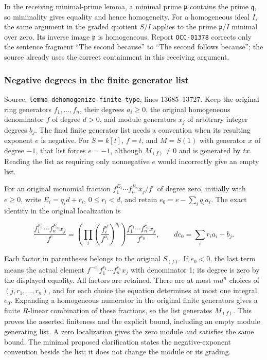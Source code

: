 In the receiving minimal-prime lemma, a minimal prime \(\mathfrak p\) contains the prime \(\mathfrak q\), so minimality gives equality and hence homogeneity. For a homogeneous ideal \(I\), the same argument in the graded quotient \(S/I\) applies to the prime \(\mathfrak p/I\) minimal over zero. Its inverse image \(\mathfrak p\) is homogeneous. Report \texttt{OCC-01378} corrects only the sentence fragment ``The second because'' to ``The second follows because''; the source already uses the correct containment in this receiving argument.

\subsubsection{Negative degrees in the finite generator list}\label{algebra-proof-002-negative-degrees-in-the-finite-generator-list}

Source: \texttt{lemma-\AlgebraIdentifierBreak{}dehomogenize\AlgebraIdentifierBreak{}-\AlgebraIdentifierBreak{}finite-\AlgebraIdentifierBreak{}type}, lines 13685--13727. Keep the original ring generators \(f_1,\ldots,f_n\), their degrees \(a_i\geq0\), the original homogeneous denominator \(f\) of degree \(d>0\), and module generators \(x_j\) of arbitrary integer degrees \(b_j\). The final finite generator list needs a convention when its resulting exponent \(e\) is negative. For \(S=k[t]\), \(f=t\), and \(M=S(1)\) with generator \(x\) of degree \(-1\), that list forces \(e=-1\), although \(M_{(f)}\ne0\) and is generated by \(tx\). Reading the list as requiring only nonnegative \(e\) would incorrectly give an empty list.

For an original monomial fraction \(f_1^{E_1}\cdots f_n^{E_n}x_j/f^e\) of degree zero, initially with \(e\geq0\), write \(E_i=q_i d+r_i\), \(0\leq r_i<d\), and retain \(e_0=e-\sum_i q_i a_i\). The exact identity in the original localization is

\[
\frac{f_1^{E_1}\cdots f_n^{E_n}x_j}{f^e}
=\left(\prod_i\left(\frac{f_i^d}{f^{a_i}}\right)^{q_i}\right)
\frac{f_1^{r_1}\cdots f_n^{r_n}x_j}{f^{e_0}},
\qquad de_0=\sum_i r_i a_i+b_j.
\]

Each factor in parentheses belongs to the original \(S_{(f)}\). If \(e_0<0\), the last term means the actual element \(f^{-e_0}f_1^{r_1}\cdots f_n^{r_n}x_j\) with denominator 1; its degree is zero by the displayed equality. All factors are retained. There are at most \(m d^n\) choices of \((j,r_1,\ldots,r_n)\), and for each choice the equation determines at most one integral \(e_0\). Expanding a homogeneous numerator in the original finite generators gives a finite \(R\)-linear combination of these fractions, so the list generates \(M_{(f)}\). This proves the asserted finiteness and the explicit bound, including an empty module generating list. A zero localization gives the zero module and satisfies the same bound. The minimal proposed clarification states the negative-exponent convention beside the list; it does not change the module or its grading.


